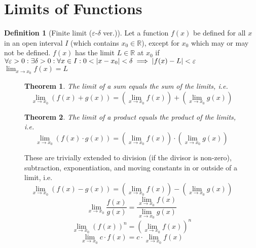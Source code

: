 \documentclass{article}
\newcommand*{\R}{\mathbb{R}}
\theoremstyle{plain}
\newtheorem{theorem}{Theorem}[section]
\numberwithin{theorem}{subsection}
\theoremstyle{definition}
\newtheorem{definition}{Definition}[section]
\numberwithin{definition}{subsection}
\theoremstyle{remark}
\numberwithin{note}{section}
\begin{document}
\section{Limits of Functions}
\begin{definition}[Finite limit ($\varepsilon$-$\delta$ ver.)]
    Let a function $f(x)$ be defined for all $x$ in an open interval $I$
    (which contains $x_0 \in \R$), except for $x_0$ which may or may not be defined.
    $f(x)$ has the limit $L \in \R$ at $x_0$ if
    $\forall\varepsilon>0: \exists\delta>0: \forall x \in I: 0<\abs{x-x_0}<\delta
    \implies \abs{f(x)-L}<\varepsilon$
    $\lim_{x\to x_0} f(x) = L$
\end{definition}
%
\begin{figure}[H]
\begin{mdframed}[style=exampledefault,frametitle={Limit laws}]
    \begin{theorem} The limit of a sum equals the sum of the limits, i.e.
        \begin{equation*}
              \lim_{x\to x_0}\left(f(x)+g(x)\right)
            = \left(\lim_{x\to x_0}f(x)\right) + \left(\lim_{x\to x_0}g(x)\right)
        \end{equation*}
    \end{theorem}
    \begin{theorem} The limit of a product equals the product of the limits, i.e.
        \begin{equation*}
          \lim_{x\to x_0}\left(f(x)\cdot g(x)\right)
        = \left(\lim_{x\to x_0}f(x)\right) \cdot \left(\lim_{x\to x_0}g(x)\right)
        \end{equation*}
    \end{theorem}

        These are trivially extended to
        division (if the divisor is non-zero),
        subtraction, exponentiation, and moving constants in or outside of a limit, i.e.
        \begin{equation*}
          \lim_{x\to x_0}\left(f(x) - g(x)\right)
        = \left(\lim_{x\to x_0}f(x)\right) - \left(\lim_{x\to x_0}g(x)\right)
        \end{equation*}
        \begin{equation*}
        \lim_{x\to x_0}\frac{f(x)}{g(x)}
        = \frac{\lim_{x\to x_0}f(x)}{\lim_{x\to x_0}g(x)}
        \end{equation*}
        \begin{equation*}
        \lim_{x\to x_0}\left(f(x)\right)^n
        = \left(\lim_{x\to x_0}f(x)\right)^n
        \end{equation*}
        \begin{equation*}
        \lim_{x\to x_0} c \cdot f(x)
        = c \cdot \lim_{x\to x_0}f(x)
        \end{equation*}
\end{mdframed}
\end{figure}
\end{document}
